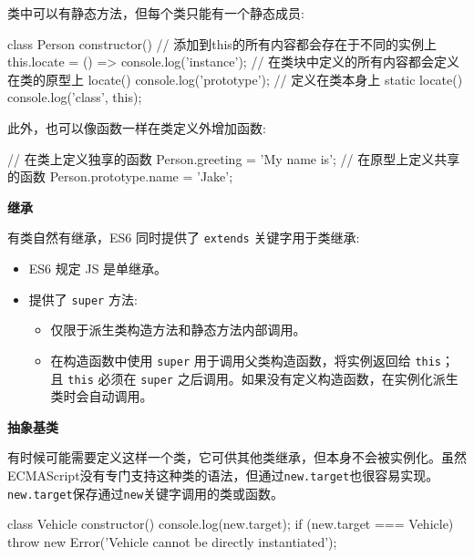 类中可以有静态方法，但每个类只能有一个静态成员:

\begin{JavaScript}
class Person {
    constructor() {     // 添加到this的所有内容都会存在于不同的实例上    
        this.locate = () => console.log('instance');
    } 
    // 在类块中定义的所有内容都会定义在类的原型上
    locate() {
        console.log('prototype');
    }
    // 定义在类本身上  
    static locate() {
        console.log('class', this);
    } 
}
\end{JavaScript}

此外，也可以像函数一样在类定义外增加函数:

\begin{JavaScript}
// 在类上定义独享的函数
Person.greeting = 'My name is'; 
// 在原型上定义共享的函数
Person.prototype.name = 'Jake';
\end{JavaScript}

\noindent\textbf{继承}

有类自然有继承，ES6 同时提供了 \texttt{extends} 关键字用于类继承:
\begin{itemize}
    \item ES6 规定 JS 是单继承。
    \item 提供了 \texttt{super} 方法:
    \begin{itemize}
        \item 仅限于派生类构造方法和静态方法内部调用。
        \item 在构造函数中使用 \texttt{super} 用于调用父类构造函数，将实例返回给 \texttt{this}；且 \texttt{this} 必须在 \texttt{super} 之后调用。如果没有定义构造函数，在实例化派生类时会自动调用。
    \end{itemize}
\end{itemize}

\noindent\textbf{抽象基类}

有时候可能需要定义这样一个类，它可供其他类继承，但本身不会被实例化。虽然ECMAScript没有专门支持这种类的语法，但通过\texttt{new.target}也很容易实现。\texttt{new.target}保存通过\texttt{new}关键字调用的类或函数。

\begin{JavaScript}
class Vehicle {
    constructor() {
        console.log(new.target);
        if (new.target === Vehicle) {
            throw new Error('Vehicle cannot be directly instantiated');
        }
    }
}
\end{JavaScript}

\newpage